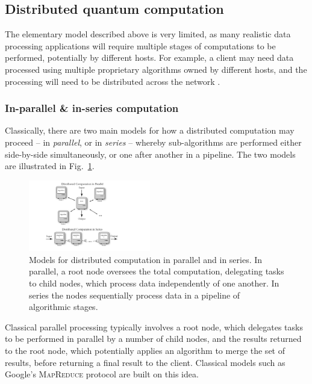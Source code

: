%
%

\subsection{Distributed quantum computation} \label{sec:dist_QC} 

The elementary model described above is very limited, as many realistic data processing applications will require multiple stages of computations to be performed, potentially by different hosts. For example, a client may need data processed using multiple proprietary algorithms owned by different hosts, and the processing will need to be distributed across the network \cite{bib:Cirac99}.

\subsubsection{In-parallel \& in-series computation}

Classically, there are two main models for how a distributed computation may proceed -- in \textit{parallel}, or in \textit{series} -- whereby sub-algorithms are performed either side-by-side simultaneously, or one after another in a pipeline. The two models are illustrated in Fig.~\ref{fig:distributed}.

\begin{figure}[!htbp]
\includegraphics[width=0.475\textwidth]{distributed}
\captionspace \caption{Models for distributed computation in parallel and in series. In parallel, a root node oversees the total computation, delegating tasks to child nodes, which process data independently of one another. In series the nodes sequentially process data in a pipeline of algorithmic stages.} \label{fig:distributed}
\end{figure}

Classical parallel processing typically involves a root node, which delegates tasks to be performed in parallel by a number of child nodes, and the results returned to the root node, which potentially applies an algorithm to merge the set of results, before returning a final result to the client. Classical models such as Google's \textsc{MapReduce} protocol \cite{bib:MapReduce} are built on this idea.

